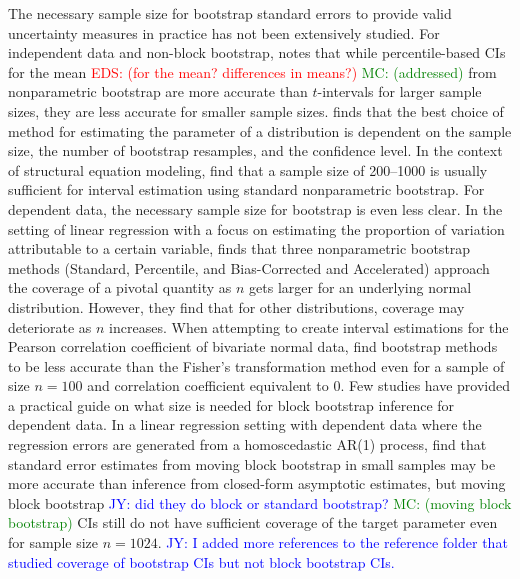 \documentclass[12pt, letterpaper, titlepage]{article}
\newcommand{\jy}[1]{\textcolor{blue}{JY: #1}}
\newcommand{\eds}[1]{\textcolor{red}{EDS: (#1)}}
\newcommand{\mc}[1]{\textcolor{green}{MC: (#1)}}
\begin{document}
The necessary sample size for bootstrap standard errors to provide valid
uncertainty measures in practice has not been extensively studied. For
independent data and non-block bootstrap, \citet{hesterberg2015teachers} notes
that while percentile-based CIs for the mean \eds{for the mean? differences in means?} \mc{addressed} from 
nonparametric bootstrap
are more accurate than $t$-intervals for larger sample sizes, they are
less accurate for smaller sample sizes. \citet{chernick2009revisiting} finds 
that the best choice of method for estimating
the parameter of a distribution is dependent on the sample size, the number of
bootstrap resamples, and the confidence level. In the context of structural equation
modeling, \citet{nevitt2001performance} find
that a sample size of 200--1000 is usually sufficient for interval estimation
using standard nonparametric bootstrap. For dependent data, the necessary
sample
size for bootstrap is even less clear. In the setting of linear regression with a
focus on estimating the proportion of 
variation attributable to a certain variable, \citet{burch2012nonparametric} finds
that three nonparametric bootstrap methods (Standard, Percentile, and Bias-Corrected
and
Accelerated) approach the coverage of a pivotal quantity as $n$ gets larger for an
underlying normal distribution. However, they find that for other distributions, 
coverage may deteriorate as $n$ increases. 
When attempting to create interval estimations for the Pearson correlation 
coefficient of bivariate normal data, \citet{puth2015variety} find bootstrap 
methods to be less accurate than the Fisher's transformation method even 
for a sample of size $n = 100$ and correlation coefficient equivalent to 0.
Few studies have provided a practical guide on what size is needed
for block bootstrap inference for dependent data.
In a linear regression setting
with
dependent data where the
regression errors are generated from a homoscedastic AR(1) process, 
\citet{goncalves2005bootstrap} find that standard error
estimates from moving 
block bootstrap in small samples may be more accurate than
inference from closed-form asymptotic estimates, but moving block bootstrap 
\jy{did they do block or standard bootstrap?}
\mc{moving block bootstrap}
CIs still do not have sufficient coverage of the target parameter even for sample size
$n = 1024$.
\jy{I added more references to the reference folder that studied coverage of
  bootstrap CIs but not block bootstrap CIs.}
\end{document}
